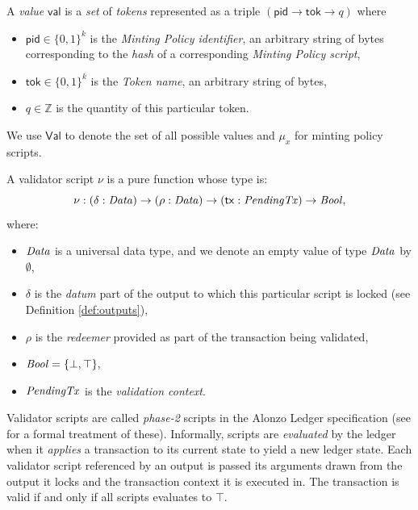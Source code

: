 \begin{definition}[Value]

A \emph{value} $\mathsf{val}$ is a \emph{set} of \emph{tokens} represented as a triple $(\mathsf{pid} \rightarrow \mathsf{tok} \rightarrow q)$ where
\begin{itemize}
    \item $\mathsf{pid} \in \{0,1\}^k$ is the \emph{Minting Policy identifier}, an arbitrary string of bytes corresponding to the \emph{hash} of a corresponding \emph{Minting Policy script},
    \item $\mathsf{tok} \in \{0,1\}^k$ is the \emph{Token name}, an arbitrary string of bytes,
    \item $q \in \mathbb{Z}$ is the quantity of this particular token.
\end{itemize}

\end{definition}

We use $\mathsf{Val}$ to denote the set of all possible values and  $\mu_x$ for minting policy scripts.

\begin{definition}
A validator script $\nu$ is a pure function whose type is:
\[
  \nu : (\delta : \mathit{Data}) \to (\rho : \mathit{Data}) \to (\mathsf{tx} : \mathit{PendingTx})
  \to\mathit{Bool},
\]
where: 
\begin{itemize}
    \item $\mathit{Data}$ is a universal data type, and we denote an empty value of type $\mathit{Data}$ by $\emptyset$,  
    \item $\delta$ is the \emph{datum} part of the output to which this particular script is locked (see Definition \ref{def:outputs}),
    \item $\rho$ is the \emph{redeemer} provided as part of the transaction being validated,
    \item $\mathit{Bool} = \{\bot, \top\},$
    \item $\mathit{PendingTx}$ is the \emph{validation context}.
\end{itemize}
\end{definition}

Validator scripts are called \emph{phase-2} scripts in the Alonzo Ledger specification (see \cite{alozon-spec} for a formal treatment of these). Informally, scripts are \emph{evaluated} by the ledger when it \emph{applies} a transaction to its current state to yield a new ledger state. Each validator script referenced by an output is passed its arguments drawn from the output it locks and the transaction context it is executed in. The transaction is valid if and only if all scripts evaluates to $\top.$

